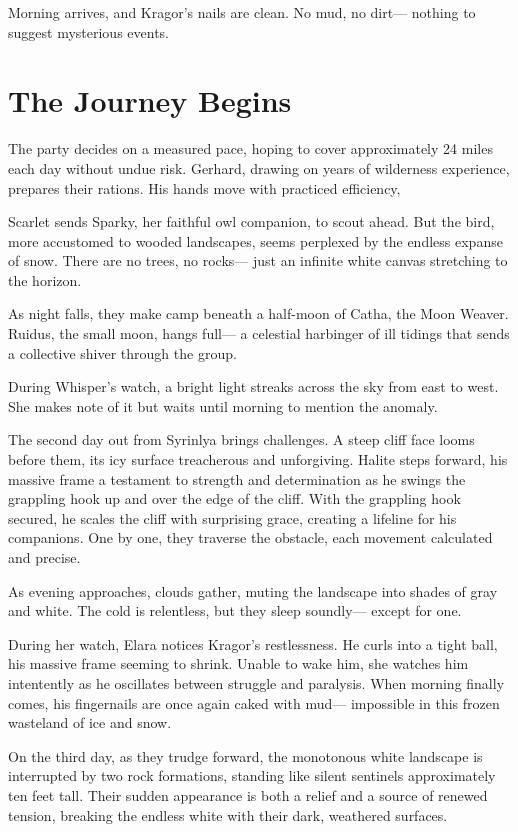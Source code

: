 \documentclass[
  letterpaper,12pt,twoside,twocolumn,openany,
  nodeprecatedcode,bg=full]{dndbook}
\begin{document}
Morning arrives, and Kragor's nails are clean. No mud, no dirt---
nothing to suggest mysterious events.

\section{The Journey Begins}\label{the-journey-begins}

The party decides on a measured pace, hoping to cover approximately 24
miles each day without undue risk. Gerhard, drawing on years of
wilderness experience, prepares their rations. His hands move with
practiced efficiency,

Scarlet sends Sparky, her faithful owl companion, to scout ahead. But
the bird, more accustomed to wooded landscapes, seems perplexed by the
endless expanse of snow. There are no trees, no rocks--- just an
infinite white canvas stretching to the horizon.

As night falls, they make camp beneath a half-moon of Catha, the Moon
Weaver. Ruidus, the small moon, hangs full--- a celestial harbinger of
ill tidings that sends a collective shiver through the group.

During Whisper's watch, a bright light streaks across the sky from east
to west. She makes note of it but waits until morning to mention the
anomaly.

The second day out from Syrinlya brings challenges. A steep cliff face
looms before them, its icy surface treacherous and unforgiving. Halite
steps forward, his massive frame a testament to strength and
determination as he swings the grappling hook up and over the edge of
the cliff. With the grappling hook secured, he scales the cliff with
surprising grace, creating a lifeline for his companions. One by one,
they traverse the obstacle, each movement calculated and precise.

As evening approaches, clouds gather, muting the landscape into shades
of gray and white. The cold is relentless, but they sleep soundly---
except for one.

During her watch, Elara notices Kragor's restlessness. He curls into a
tight ball, his massive frame seeming to shrink. Unable to wake him, she
watches him intentently as he oscillates between struggle and paralysis.
When morning finally comes, his fingernails are once again caked with
mud--- impossible in this frozen wasteland of ice and snow.

On the third day, as they trudge forward, the monotonous white landscape
is interrupted by two rock formations, standing like silent sentinels
approximately ten feet tall. Their sudden appearance is both a relief
and a source of renewed tension, breaking the endless white with their
dark, weathered surfaces.
\end{document}
